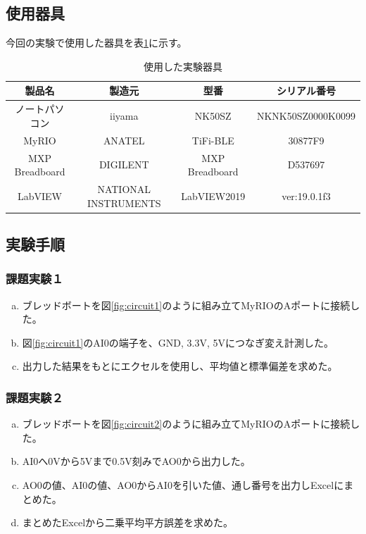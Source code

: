 \documentclass[11pt,dvipdfmx]{jarticle}
\begin{document}
\subsection{使用器具}
今回の実験で使用した器具を表\ref{tab:tools}に示す。
\begin{table}[hbtp]
	\caption{使用した実験器具}
	\label{tab:tools}
	\centering
	\begin{tabular}{|c|c|c|c|}
		\hline
		製品名　& 製造元　& 型番 & シリアル番号\\
		\hline \hline
		ノートパソコン & iiyama &NK50SZ& NKNK50SZ0000K0099\\
		\hline
		MyRIO & ANATEL &TiFi-BLE& 30877F9\\
		\hline
		MXP Breadboard & DIGILENT &MXP Breadboard& D537697\\
		\hline
		LabVIEW & NATIONAL INSTRUMENTS &LabVIEW2019& ver:19.0.1f3\\
		\hline
	\end{tabular}
	
\end{table}

\subsection{実験手順}
	\subsubsection{課題実験１}
		\begin{enumerate}[a.]
			\item ブレッドボートを図\ref{fig:circuit1}のように組み立てMyRIOのAポートに接続した。
			\item 図\ref{fig:circuit1}のAI0の端子を、GND, 3.3V, 5Vにつなぎ変え計測した。
			\item 出力した結果をもとにエクセルを使用し、平均値と標準偏差を求めた。
		\end{enumerate}

	\subsubsection{課題実験２}
		\begin{enumerate}[a.]
			\item ブレッドボートを図\ref{fig:circuit2}のように組み立てMyRIOのAポートに接続した。
			\item AI0へ0Vから5Vまで0.5V刻みでAO0から出力した。
			\item AO0の値、AI0の値、AO0からAI0を引いた値、通し番号を出力しExcelにまとめた。
			\item まとめたExcelから二乗平均平方誤差を求めた。
		\end{enumerate}
\end{document}
